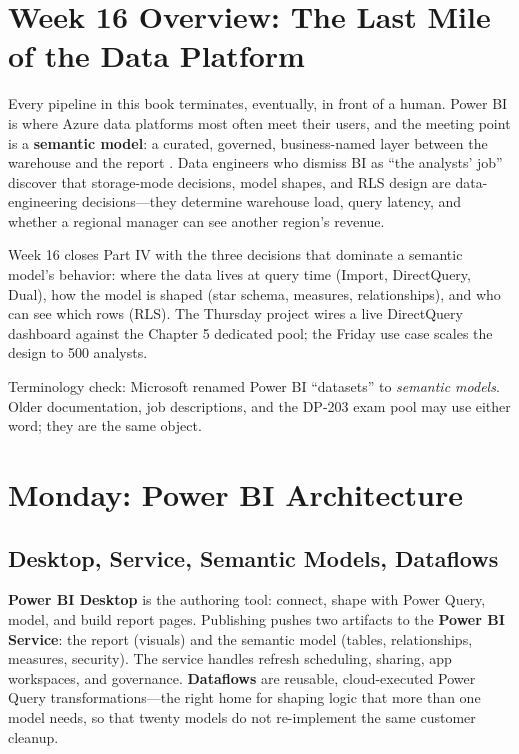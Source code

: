 \section{Week 16 Overview: The Last Mile of the Data Platform}
Every pipeline in this book terminates, eventually, in front of a human. Power BI is where Azure data platforms most often meet their users, and the meeting point is a \textbf{semantic model}: a curated, governed, business-named layer between the warehouse and the report \cite{microsoft2025powerbi}. Data engineers who dismiss BI as ``the analysts' job'' discover that storage-mode decisions, model shapes, and RLS design are data-engineering decisions---they determine warehouse load, query latency, and whether a regional manager can see another region's revenue.

Week 16 closes Part IV with the three decisions that dominate a semantic model's behavior: where the data lives at query time (Import, DirectQuery, Dual), how the model is shaped (star schema, measures, relationships), and who can see which rows (RLS). The Thursday project wires a live DirectQuery dashboard against the Chapter 5 dedicated pool; the Friday use case scales the design to 500 analysts.

\begin{notebox}
Terminology check: Microsoft renamed Power BI ``datasets'' to \emph{semantic models}. Older documentation, job descriptions, and the DP-203 exam pool may use either word; they are the same object.
\end{notebox}

\section{Monday: Power BI Architecture}

\subsection{Desktop, Service, Semantic Models, Dataflows}
\textbf{Power BI Desktop} is the authoring tool: connect, shape with Power Query, model, and build report pages. Publishing pushes two artifacts to the \textbf{Power BI Service}: the report (visuals) and the semantic model (tables, relationships, measures, security). The service handles refresh scheduling, sharing, app workspaces, and governance. \textbf{Dataflows} are reusable, cloud-executed Power Query transformations---the right home for shaping logic that more than one model needs, so that twenty models do not re-implement the same customer cleanup.

